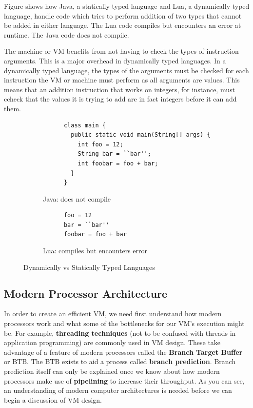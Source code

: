 \documentclass[english,a4paper]{article}
\begin{document}
Figure \pageref{fig:dvs} shows how Java, a statically typed language
and Lua, a dynamically typed language, handle code which tries to
perform addition of two types that cannot be added in either
language. The Lua code compiles but encounters an error at
runtime. The Java code does not compile.

The machine or VM benefits from not having to check the types of
instruction arguments. This is a major overhead in dynamically typed
languages. In a dynamically typed language, the types of the arguments must be checked for each instruction the VM or machine must perform as all arguments are values. This means that an addition instruction that works on integers, for instance, must ccheck that the values it is trying to add are in fact integers before
it can add them.

\begin{figure}
  \begin{subfigure}{.48\textwidth}
    \begin{lstlisting}
      class main {
        public static void main(String[] args) {
          int foo = 12;
          String bar = ``bar'';
          int foobar = foo + bar;
        }
      }
    \end{lstlisting}
    \caption{Java: does not compile}
  \end{subfigure}
  \begin{subfigure}{.48\textwidth}
    \begin{lstlisting}
      foo = 12
      bar = ``bar''
      foobar = foo + bar
    \end{lstlisting}
    \caption{Lua: compiles but encounters error}
  \end{subfigure}
  \caption{Dynamically vs Statically Typed Languages}
  \label{fig:dvs}
\end{figure}


\subsection{Modern Processor Architecture}

In order to create an efficient VM, we need first understand how
modern processors work and what some of the bottlenecks for our VM's
execution might be. For example, \textbf{threading techniques} (not to
be confused with threads in application programming) are commonly used
in VM design. These take advantage of a feature of modern processors
called the \textbf{Branch Target Buffer} or BTB. The BTB exists to aid a
process called \textbf{branch prediction}. Branch prediction itself can
only be explained once we know about how modern processors make use of
\textbf{pipelining} to increase their throughput. As you can see, an
understanding of modern computer architectures is needed before we can
begin a discussion of VM design.
\end{document}
